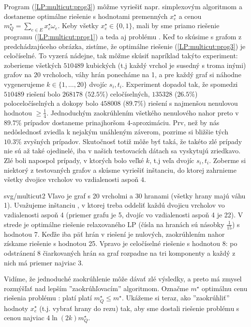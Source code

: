 \noindent
Program (\ref{LP:multicut:prog3}) môžme vyriešiť napr. simplexovým algoritmom a dostaneme optimálne riešenie
s hodnotami premenných $x_e^\star$ a cenou $m_Q^\star=\sum_{e\in E}x_e^\star\omega_e$. Keby všetky $x_e^\star\in\{0,1\}$,
mali by sme priamo riešenie programu (\ref{LP:multicut:prog1}) a teda aj problému \minmulticut. 
Keď to skúsime s grafom z predchádzajúceho obrázka, zistíme, že optimálne riešenie  (\ref{LP:multicut:prog3})
je celočíselné. To vyzerá nádejne, tak môžme skúsiť napríklad takýto experiment: zoberieme všetkých $510 489$ kubických
(t.j každý vrchol je susedný s troma inými) grafov na $20$ vrcholoch, váhy hrán ponecháme na 1, 
a pre každý graf si náhodne vygenerujeme  $k\in\{1,\ldots,20\}$ dvojíc $s_i, t_i$. Experiment dopadol tak,
že spomedzi $510 489$ riešení bolo $268 178$ ($52.5\%$) celočíselných, $135 328$ ($26.5\%$) poloceločíselných
a dokopy bolo $458 008$ ($89.7\%$) riešení s najmenšou nenulovou hodnotou $\ge\frac{1}{4}$.
Jednoduchým zaokrúhlením všetkého nenulového nahor preto v $89.7\%$ prípadov dostaneme prinajhoršom 4-aproximáciu.
Prv, než by nás nedôslednosť zviedla k nejakým unáhleným záverom, pozrime si bližšie tých $10.3\%$
zvyšných prípadov. 
Skutočnosť totiž môže byť taká, že takéto zlé prípady nie sú až také ojedinelé, iba v našich testovacích 
dátach sa vyskytujú zriedkavo.
Zlé boli napospol prípady, v ktorých bolo veľké $k$, t.j 
veľa dvojíc $s_i,t_i$. Zoberme si niektorý z testovaných grafov a skúsme vyriešiť inštanciu,
do ktorej zahrnieme všetky dvojice vrcholov vo vzdialenosti aspoň $4$.

\begin{myfig}{\textwidth}{svg/multicut2}
  Vľavo je graf s 20 vrcholmi a 30 hranami (všetky hrany majú váhu 1). 
  Uvažujeme inštanciu \minmulticut, v ktorej treba oddeliť každú dvojicu
vrcholov vo vzdialenosti aspoň 4 (priemer grafu je 5, dvojíc vo vzdialenosti aspoň 4 je 22). V strede je optimálne
riešenie relaxovaného LP (čísla na hranách sú násobky $\frac{1}{15}$) s hodnotou 7. Keďže iba päť hrán
v riešení je nulových, zaokrúhlením nahor získame riešenie s hodnotou 25. Vpravo je celočíselné riešenie
s hodnotou 8: po odstránení 8 čiarkovaných hrán sa graf rozpadne na tri komponenty a každý z nich má priemer najviac 3. 
\end{myfig}


\noindent
Vidíme, že jednoduché zaokrúhlenie môže dávať zlé výsledky, a preto má zmysel rozmýšľať nad lepším
''zaokrúhľovacím'' algoritmom.
Označme $m^\star$ optimálnu cenu riešenia problému \minmulticut: platí
platí $m_Q^\star\le m^\star$. Ukážeme si teraz, ako ''zaokrúhliť'' hodnoty $x_e^\star$ (t.j. vybrať
hrany do rezu) tak, aby sme
dostali riešenie problému \minmulticut s cenou najviac $4\ln(2k)m_Q^\star$.

